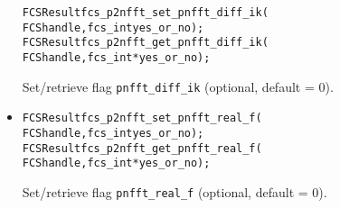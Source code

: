 \begin{itemize}
\begin{alltt}
FCSResult fcs_p2nfft_set_pnfft_diff_ik(
    FCS handle, fcs_int yes_or_no);
FCSResult fcs_p2nfft_get_pnfft_diff_ik(
    FCS handle, fcs_int* yes_or_no);
\end{alltt}
    Set/retrieve flag \verb!pnfft_diff_ik! (optional, default = 0).
  \item
\begin{alltt}
FCSResult fcs_p2nfft_set_pnfft_real_f(
    FCS handle, fcs_int yes_or_no);
FCSResult fcs_p2nfft_get_pnfft_real_f(
    FCS handle, fcs_int* yes_or_no);
\end{alltt}
    Set/retrieve flag \verb!pnfft_real_f! (optional, default = 0).
\end{itemize}

